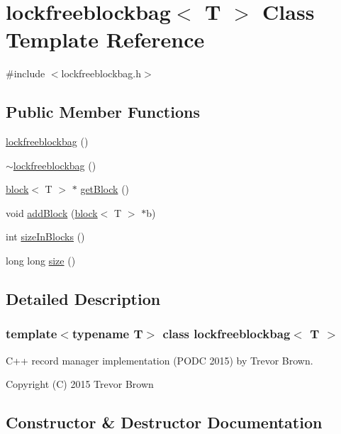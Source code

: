 \hypertarget{classlockfreeblockbag}{}\section{lockfreeblockbag$<$ T $>$ Class Template Reference}
\label{classlockfreeblockbag}


{\ttfamily \#include $<$lockfreeblockbag.\+h$>$}

\subsection*{Public Member Functions}
\begin{DoxyCompactItemize}
\item 
\hyperlink{classlockfreeblockbag_ac5616d633983eeb539a8e0c05e120503}{lockfreeblockbag} ()
\item 
\hyperlink{classlockfreeblockbag_ab6f3bc34595acb7ac17072acf2ae7901}{$\sim$lockfreeblockbag} ()
\item 
\hyperlink{classblock}{block}$<$ T $>$ $\ast$ \hyperlink{classlockfreeblockbag_a3e6f92b70c0192308972fb21f3576bfc}{get\+Block} ()
\item 
void \hyperlink{classlockfreeblockbag_a722c146f5d2b578426cc9c418f394486}{add\+Block} (\hyperlink{classblock}{block}$<$ T $>$ $\ast$b)
\item 
int \hyperlink{classlockfreeblockbag_a3fe5902187ab6395bee9c4c9b2648a19}{size\+In\+Blocks} ()
\item 
long long \hyperlink{classlockfreeblockbag_afb3b6cce79e57e7c46d1ca7933313ef0}{size} ()
\end{DoxyCompactItemize}


\subsection{Detailed Description}
\subsubsection*{template$<$typename T$>$\newline
class lockfreeblockbag$<$ T $>$}

C++ record manager implementation (P\+O\+DC 2015) by Trevor Brown.

Copyright (C) 2015 Trevor Brown 

\subsection{Constructor \& Destructor Documentation}
\mbox{\label{classlockfreeblockbag_ac5616d633983eeb539a8e0c05e120503}} 
